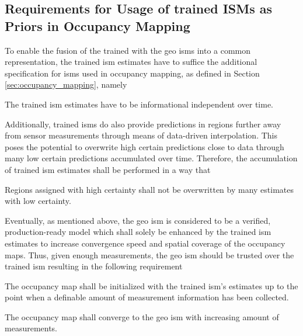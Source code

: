 \subsection{Requirements for Usage of trained ISMs as Priors in Occupancy Mapping}
\label{subsec:requirements_for_usage_of_deep_ims_as_priors_in_occmapping}
To enable the fusion of the trained with the geo \gls{ism}s into a common representation, the trained \gls{ism} estimates have to suffice the additional specification for \gls{ism}s used in occupancy mapping, as defined in Section \ref{sec:occupancy_mapping}, namely
\\
\setcounter{req}{2}
\setcounter{subreq}{0}
\begin{subreq} \label{subreq:indep_info}
	The trained \gls{ism} estimates have to be informational independent over time.
\end{subreq}
Additionally, trained \gls{ism}s do also provide predictions in regions further away from sensor measurements through means of data-driven interpolation. This poses the potential to overwrite high certain predictions close to data through many low certain predictions accumulated over time. Therefore, the accumulation of trained \gls{ism} estimates shall be performed in a way that
\\
\begin{subreq} \label{subreq:no_falsification}
	Regions assigned with high certainty shall not be overwritten by many estimates with low certainty. 
\end{subreq}
Eventually, as mentioned above, the geo \gls{ism} is considered to be a verified, production-ready model which shall solely be enhanced by the trained \gls{ism} estimates to increase convergence speed and spatial coverage of the occupancy maps. Thus, given enough measurements, the geo \gls{ism} should be trusted over the trained \gls{ism} resulting in the following requirement
\\
\begin{subreq} \label{subreq:initialize_with_deep_ism}
	The occupancy map shall be initialized with the trained \gls{ism}'s estimates up to the point when a definable amount of measurement information has been collected.
\end{subreq}
\begin{subreq} \label{subreq:converge_to_geo_ism}
	The occupancy map shall converge to the geo \gls{ism} with increasing amount of measurements.
\end{subreq}
%

